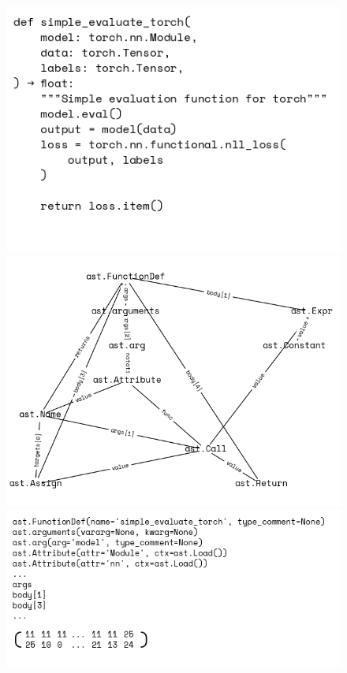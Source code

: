 \documentclass[sigplan,screen,anonymous,natbib=false]{acmart}
\begin{document}
\begin{figure}[!ht]
    \centering
    \begin{minipage}[l]{0.3\textwidth}
        \centering
        \includegraphics[width=\linewidth]{assets/source.tiff}
    \end{minipage}
    \hspace*{\fill}
    \begin{minipage}[l]{0.35\textwidth}
        \centering
        \includegraphics[width=\linewidth]{assets/graph.tiff}
    \end{minipage}
    \hspace*{\fill}
    \begin{minipage}[l]{0.35\textwidth}
        \centering
        \includegraphics[width=\linewidth]{assets/tokens.tiff}

\end{minipage}
\end{figure}
\end{document}
